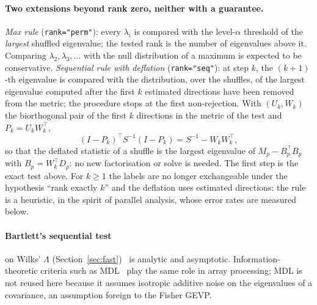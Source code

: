 \documentclass[11pt,a4paper]{article}
\theoremstyle{plain}
\theoremstyle{definition}
\theoremstyle{remark}
\newcommand{\T}{\top}
\begin{document}
\paragraph{Two extensions beyond rank zero, neither with a guarantee.}
\emph{Max rule} (\texttt{rank="perm"}): every $\lambda_i$ is compared with
the level-$\alpha$ threshold of the \emph{largest} shuffled eigenvalue; the
tested rank is the number of eigenvalues above it. Comparing
$\lambda_2,\lambda_3,\dots$ with the null distribution of a maximum is
expected to be conservative. \emph{Sequential rule with deflation}
(\texttt{rank="seq"}): at step $k$, the $(k+1)$-th eigenvalue is compared
with the distribution, over the shuffles, of the largest eigenvalue
computed after the first $k$ estimated directions have been removed from
the metric; the procedure stops at the first non-rejection. With $(U_k,W_k)$
the biorthogonal pair of the first $k$ directions in the metric of the
test and $P_k=U_kW_k^\T$,
\[
(I-P_k)^\T S^{-1}(I-P_k)=S^{-1}-W_kW_k^\T ,
\]
so that the deflated statistic of a shuffle is the largest eigenvalue of
$M_p-B_p^\T B_p$ with $B_p=W_k^\T D_p$: no new factorisation or solve is
needed. The first step is the exact test above. For $k\ge1$ the labels are
no longer exchangeable under the hypothesis ``rank exactly $k$'' and the
deflation uses estimated directions: the rule is a heuristic, in the
spirit of parallel analysis, whose error rates are measured below.

\paragraph{Bartlett's sequential test} on Wilks' $\Lambda$
(Section~\ref{sec:fast})~\cite{bartlett1947} is analytic and asymptotic.
Information-theoretic criteria such as MDL~\cite{waxkailath1985} play the
same role in array processing; MDL is not reused here because it assumes
isotropic additive noise on the eigenvalues of a covariance, an assumption
foreign to the Fisher GEVP.
\end{document}
